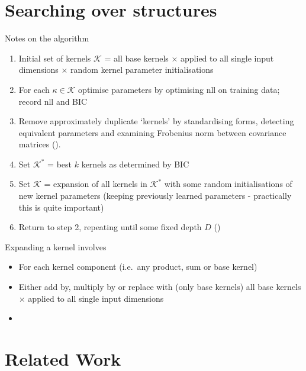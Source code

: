 \documentclass[twoside]{article}
\begin{document}
\section{Searching over structures}


Notes on the algorithm
\begin{enumerate}
\item Initial set of kernels $\mathcal{K}$ = all base kernels $\times$ applied to all single input dimensions $\times$ random kernel parameter initialisations
\item For each $\kappa \in \mathcal{K}$ optimise parameters by optimising nll on training data; record nll and BIC
\item Remove approximately duplicate `kernels' by standardising forms, detecting equivalent parameters and examining Frobenius norm between covariance matrices ().
\item Set $\mathcal{K}^*$ = best $k$ kernels as determined by BIC
\item Set $\mathcal{K}$ = expansion of all kernels in $\mathcal{K}^*$ with some random initialisations of new kernel parameters (keeping previously learned parameters - practically this is quite important)
\item Return to step 2, repeating until some fixed depth $D$ ()
\end{enumerate}

Expanding a kernel involves
\begin{itemize}
\item For each kernel component (i.e.~any product, sum or base kernel)
\item Either add by, multiply by or replace with (only base kernels) all base kernels $\times$ applied to all single input dimensions
\item {}
\end{itemize}

\section{Related Work}
\end{document}
